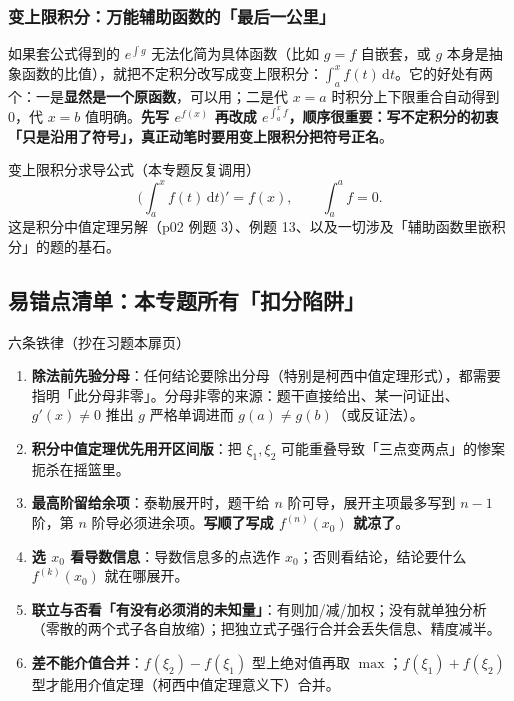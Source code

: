 \documentclass[a4paper]{article}
\begin{document}
\subsubsection{变上限积分：万能辅助函数的「最后一公里」}

如果套公式得到的 $e^{\int g}$ 无法化简为具体函数（比如 $g=f$ 自嵌套，或 $g$ 本身是抽象函数的比值），就把不定积分改写成变上限积分：$\int_a^x f(t)\,\mathrm{d}t$。它的好处有两个：一是\textbf{显然是一个原函数}，可以用；二是代 $x=a$ 时积分上下限重合自动得到 0，代 $x=b$ 值明确。\textbf{先写 $e^{f(x)}$ 再改成 $e^{\int_a^x f}$，顺序很重要：写不定积分的初衷「只是沿用了符号」，真正动笔时要用变上限积分把符号正名}。

\begin{knowledgebox}{变上限积分求导公式（本专题反复调用）}
\[
\Big(\int_a^x f(t)\,\mathrm{d}t\Big)'=f(x),\qquad \int_a^a f=0 .
\]
这是积分中值定理另解（p02 例题 3）、例题 13、以及一切涉及「辅助函数里嵌积分」的题的基石。
\end{knowledgebox}

\subsection{易错点清单：本专题所有「扣分陷阱」}

\begin{importantbox}{六条铁律（抄在习题本扉页）}
\begin{enumerate}
\item \textbf{除法前先验分母}：任何结论要除出分母（特别是柯西中值定理形式），都需要指明「此分母非零」。分母非零的来源：题干直接给出、某一问证出、$g'(x)\neq0$ 推出 $g$ 严格单调进而 $g(a)\neq g(b)$（或反证法）。
\item \textbf{积分中值定理优先用开区间版}：把 $\xi_1,\xi_2$ 可能重叠导致「三点变两点」的惨案扼杀在摇篮里。
\item \textbf{最高阶留给余项}：泰勒展开时，题干给 $n$ 阶可导，展开主项最多写到 $n-1$ 阶，第 $n$ 阶导必须进余项。\textbf{写顺了写成 $f^{(n)}(x_0)$ 就凉了}。
\item \textbf{选 $x_0$ 看导数信息}：导数信息多的点选作 $x_0$；否则看结论，结论要什么 $f^{(k)}(x_0)$ 就在哪展开。
\item \textbf{联立与否看「有没有必须消的未知量」}：有则加/减/加权；没有就单独分析（零散的两个式子各自放缩）；把独立式子强行合并会丢失信息、精度减半。
\item \textbf{差不能介值合并}：$f(\xi_2)-f(\xi_1)$ 型上绝对值再取 $\max$；$f(\xi_1)+f(\xi_2)$ 型才能用介值定理（柯西中值定理意义下）合并。
\end{enumerate}
\end{importantbox}
\end{document}

